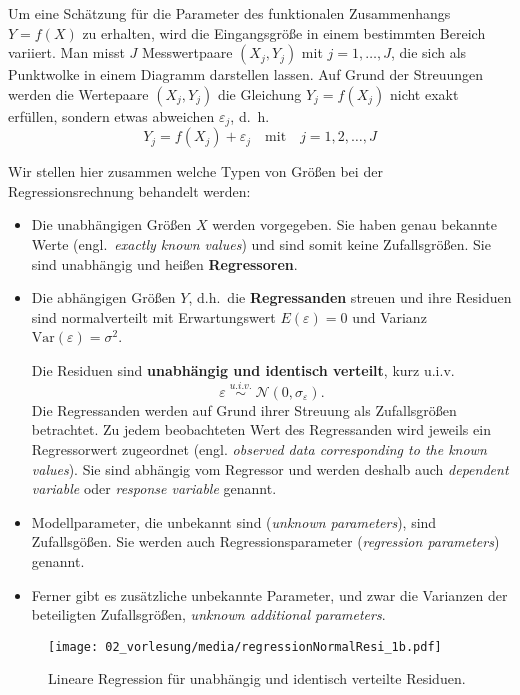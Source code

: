 Um eine Schätzung für die Parameter des funktionalen Zusammenhangs $Y = f(X)$
zu erhalten, wird die Eingangsgröße in einem bestimmten Bereich
variiert. Man misst $J$ Messwertpaare $(X_j ,Y_j )$ mit $j=1,\ldots, J$, die sich als Punktwolke in einem Diagramm darstellen lassen. Auf Grund der Streuungen werden die Wertepaare $(X_j, Y_j )$
die Gleichung $Y_j = f(X_j )$ nicht exakt erfüllen,
sondern etwas abweichen $\varepsilon_j$, d.~h.
\begin{equation}
Y_j = f(X_j) + \varepsilon_j \quad \mathrm{mit} \quad j = 1,2,\ldots,J
\label{Kap2ModellglmitResiduen}
\end{equation}

Wir stellen hier zusammen welche Typen von Größen bei der Regressionsrechnung behandelt werden:
\begin{itemize}
	\item Die unabhängigen Größen $X$ werden
	 vorgegeben. Sie haben genau bekannte Werte (engl.\ \textsl{exactly known values})
	und sind somit keine Zufallsgrößen. Sie sind unabhängig und
	heißen \textbf{Regressoren}.
	\item Die abhängigen Größen $Y$, d.h.\ die \textbf{Regressanden} streuen und ihre Residuen sind
	normalverteilt mit Erwartungswert $E(\varepsilon) = 0$ und Varianz $\mathrm{Var}(\varepsilon) = \sigma^2$.

	Die Residuen sind \textbf{unabhängig und identisch verteilt}, kurz u.i.v.
	\begin{equation}
	\varepsilon \; \overset{u.i.v.}{\sim} \; \mathcal{N}(0,\sigma_{\varepsilon}) .
	\label{Resinormalverteilt}
	\end{equation}
	Die Regressanden werden auf Grund ihrer Streuung als Zufallsgrößen betrachtet.
	Zu jedem beobachteten Wert des Regressanden wird jeweils ein Regressorwert
	zugeordnet (engl. \textsl{observed data corresponding to the known values}).
	Sie sind abhängig vom Regressor und werden deshalb auch \textsl{dependent variable} oder
	\textsl{response variable} genannt.
	\item Modellparameter, die unbekannt sind (\textsl{unknown parameters}), sind Zufallsgößen. Sie werden
	auch Regressionsparameter (\textsl{regression parameters}) genannt.
	\item Ferner gibt es zusätzliche unbekannte Parameter, und zwar die Varianzen der beteiligten
	Zufallsgrößen, \textsl{unknown additional parameters}. %
\end{itemize}

\begin{figure}
	\begin{center}
		\texttt{[image: 02\_vorlesung/media/regressionNormalResi\_1b.pdf]}
		\caption{\label{regressionNormalResi} Lineare Regression für unabhängig und
			identisch verteilte Residuen.}
	\end{center}
\end{figure}

